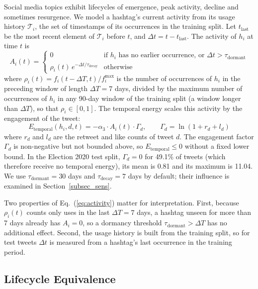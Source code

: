 \documentclass[pdflatex,sn-mathphys-num]{sn-jnl}%
\begin{document}
Social media topics exhibit lifecycles of emergence, peak activity, decline and sometimes resurgence. We model a hashtag's current activity from its usage history $\mathcal{T}_i$, the set of timestamps of its occurrences in the training split. Let $t_{\text{last}}$ be the most recent element of $\mathcal{T}_i$ before $t$, and $\Delta t = t - t_{\text{last}}$. The activity of $h_i$ at time $t$ is
\begin{equation}
A_i(t) =
\begin{cases}
0 & \text{if } h_i \text{ has no earlier occurrence, or } \Delta t > \tau_{\text{dormant}} \\[2pt]
\rho_i(t)\, e^{-\Delta t / \tau_{\text{decay}}} & \text{otherwise}
\end{cases}
\label{eq:activity}
\end{equation}
where $\rho_i(t) = f_i(t-\Delta T, t) / f_i^{\max}$ is the number of occurrences of $h_i$ in the preceding window of length $\Delta T = 7$ days, divided by the maximum number of occurrences of $h_i$ in any 90-day window of the training split (a window longer than $\Delta T$), so that $\rho_i \in [0,1]$. The temporal energy scales this activity by the engagement of the tweet:
\begin{equation}
E_{\text{temporal}}(h_i, d, t) = -\alpha_3 \cdot A_i(t) \cdot \Gamma_d, \qquad \Gamma_d = \ln(1 + r_d + l_d)
\label{eq:temporal}
\end{equation}
where $r_d$ and $l_d$ are the retweet and like counts of tweet $d$. The engagement factor $\Gamma_d$ is non-negative but not bounded above, so $E_{\text{temporal}} \le 0$ without a fixed lower bound. In the Election 2020 test split, $\Gamma_d = 0$ for 49.1\% of tweets (which therefore receive no temporal energy), its mean is 0.81 and its maximum is 11.04. We use $\tau_{\text{dormant}} = 30$ days and $\tau_{\text{decay}} = 7$ days by default; their influence is examined in Section~\ref{subsec_sens}.

Two properties of Eq.~(\ref{eq:activity}) matter for interpretation. First, because $\rho_i(t)$ counts only uses in the last $\Delta T = 7$ days, a hashtag unseen for more than 7 days already has $A_i = 0$, so a dormancy threshold $\tau_{\text{dormant}} > \Delta T$ has no additional effect. Second, the usage history is built from the training split, so for test tweets $\Delta t$ is measured from a hashtag's last occurrence in the training period.

\subsection{Lifecycle Equivalence}\label{subsec10}
\end{document}
